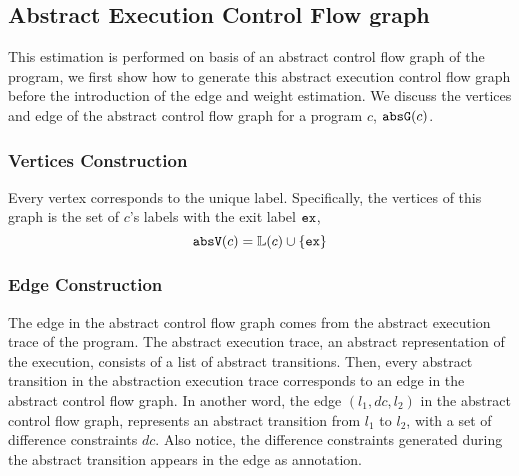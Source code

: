   

\subsection{Abstract Execution Control Flow graph}
\label{sec:abscfg}

This estimation is performed on basis of an abstract control flow graph of the program, 
we first show how to generate this abstract execution control flow graph before the introduction of  the edge and weight estimation.  
We discuss the vertices and edge of the
abstract control flow graph for a program $c$, $\mathtt{abs}{\mathtt{G}}(c)$.

\subsubsection{Vertices Construction}
\label{sec:abscfg-vertex}
Every 
vertex corresponds to the unique
label.
Specifically,
the vertices of this graph is the set of $c$'s labels with the exit label ${\mathtt{ex}}$, 
\[ 
  \mathtt{abs}{\mathtt{V}}(c) = \mathbb{L}(c)\cup\{{\mathtt{ex}}\}
  \]

\subsubsection{Edge Construction}
\label{sec:abscfg-edge}
  The edge in the abstract control flow graph comes from the abstract execution trace of the program. 
  The abstract execution trace, an abstract representation of the execution, consists of a list of abstract transitions. 
  Then, every abstract transition in the abstraction execution trace corresponds to an edge in the abstract control flow graph. In another word, the edge $(l_1, dc, l_2)$ in the abstract control flow graph, represents an abstract transition 
 from $l_1$ to $l_2$, with a set of difference constraints $dc$. 
 Also notice, the difference constraints generated during the abstract transition appears in the edge as annotation.

